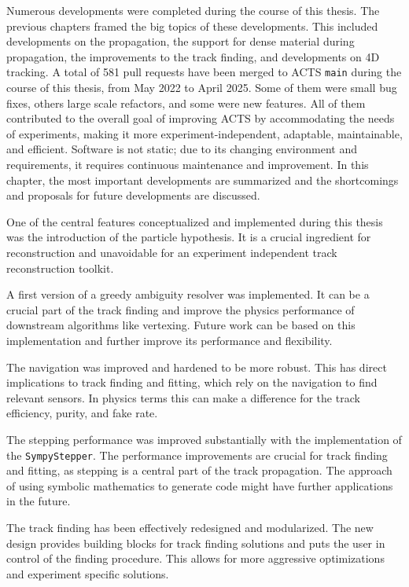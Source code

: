 Numerous developments were completed during the course of this thesis. The previous chapters framed the big topics of these developments. This included developments on the propagation, the support for dense material during propagation, the improvements to the track finding, and developments on 4D tracking. A total of 581 pull requests have been merged to ACTS \texttt{main} during the course of this thesis, from May 2022 to April 2025. Some of them were small bug fixes, others large scale refactors, and some were new features. All of them contributed to the overall goal of improving ACTS by accommodating the needs of experiments, making it more experiment-independent, adaptable, maintainable, and efficient. Software is not static; due to its changing environment and requirements, it requires continuous maintenance and improvement. In this chapter, the most important developments are summarized and the shortcomings and proposals for future developments are discussed.

One of the central features conceptualized and implemented during this thesis was the introduction of the particle hypothesis. It is a crucial ingredient for reconstruction and unavoidable for an experiment independent track reconstruction toolkit.

A first version of a greedy ambiguity resolver was implemented. It can be a crucial part of the track finding and improve the physics performance of downstream algorithms like vertexing. Future work can be based on this implementation and further improve its performance and flexibility.

The navigation was improved and hardened to be more robust. This has direct implications to track finding and fitting, which rely on the navigation to find relevant sensors. In physics terms this can make a difference for the track efficiency, purity, and fake rate.

The stepping performance was improved substantially with the implementation of the \texttt{SympyStepper}. The performance improvements are crucial for track finding and fitting, as stepping is a central part of the track propagation. The approach of using symbolic mathematics to generate code might have further applications in the future.

The track finding has been effectively redesigned and modularized. The new design provides building blocks for track finding solutions and puts the user in control of the finding procedure. This allows for more aggressive optimizations and experiment specific solutions.


